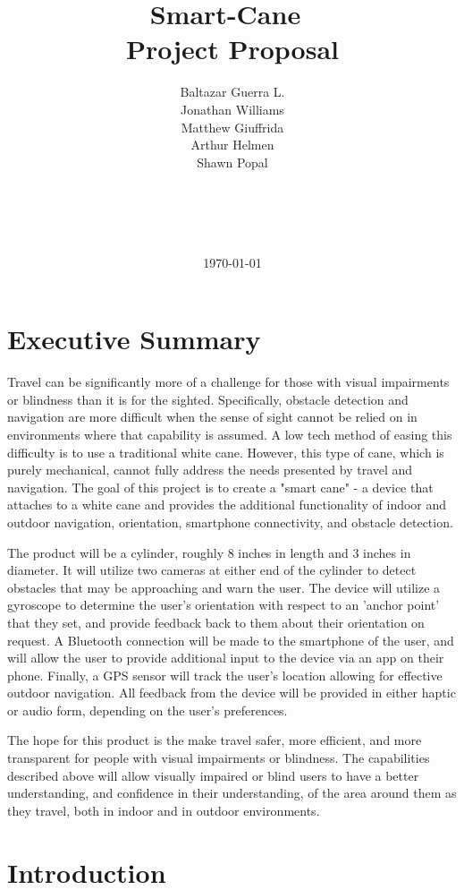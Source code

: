 \documentclass[letterpaper,12pt]{article}
\title{\textbf{\Huge Smart-Cane}\ \\ \textbf{\Huge Project Proposal}}
\author{Baltazar Guerra L.\\ Jonathan Williams \\ Matthew Giuffrida \\ Arthur Helmen \\ Shawn Popal \\ \\ \\ \\ \\}
\date{\today}
\begin{document}
\maketitle
\newpage

\tableofcontents
\newpage

\section{Executive Summary}
Travel can be significantly more of a challenge for those with visual impairments or blindness than it is for the sighted. Specifically, obstacle detection and navigation are more difficult when the sense of sight cannot be relied on in environments where that capability is assumed. A low tech method of easing this difficulty is to use a traditional white cane. However, this type of cane, which is purely mechanical, cannot fully address the needs presented by travel and navigation. The goal of this project is to create a "smart cane" - a device that attaches to a white cane and provides the additional functionality of indoor and outdoor navigation, orientation, smartphone connectivity, and obstacle detection. \par

The product will be a cylinder, roughly 8 inches in length and 3 inches in diameter. It will utilize two cameras at either end of the cylinder to detect obstacles that may be approaching and warn the user. The device will utilize a gyroscope to determine the user's orientation with respect to an 'anchor point' that they set, and provide feedback back to them about their orientation on request. A Bluetooth connection will be made to the smartphone of the user, and will allow the user to provide additional input to the device via an app on their phone. Finally, a GPS sensor will track the user's location allowing for effective outdoor navigation. All feedback from the device will be provided in either haptic or audio form, depending on the user's preferences. \par

The hope for this product is the make travel safer, more efficient, and more transparent for people with visual impairments or blindness. The capabilities described above will allow visually impaired or blind users to have a better understanding, and confidence in their understanding, of the area around them as they travel, both in indoor and in outdoor environments. \par

\section{Introduction}
\end{document}
